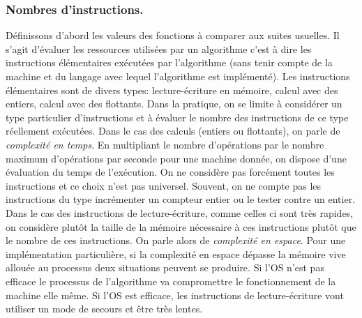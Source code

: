 \subsubsection{Nombres d'instructions.}
Définissons d'abord les valeurs des fonctions à comparer aux suites usuelles.\newline
Il s'agit d'évaluer les ressources utilisées par un algorithme c'est à dire les instructions élémentaires exécutées par l'algorithme (sans tenir compte de la machine et du langage avec lequel l'algorithme est implémenté).\newline
Les instructions élémentaires sont de divers types: lecture-écriture en mémoire, calcul avec des entiers, calcul avec des flottants.
Dans la pratique, on se limite à considérer un type particulier d'instructions et à évaluer le nombre des instructions de ce type réellement exécutées.\newline
Dans le cas des calculs (entiers ou flottants), on parle de \emph{complexité en temps}. En multipliant le nombre d'opérations par le nombre maximum d'opérations par seconde pour une machine donnée, on dispose d'une évaluation du temps de l'exécution. On ne considère pas forcément toutes les instructions et ce choix n'est pas universel. Souvent, on ne compte pas les instructions du type incrémenter un compteur entier ou le tester contre un entier.\newline
Dans le cas des instructions de lecture-écriture, comme celles ci sont très rapides, on considère plutôt la taille de la mémoire nécessaire à ces instructions plutôt que le nombre de ces instructions. On parle alors de \emph{complexité en espace}. Pour une implémentation particulière, si la complexité en espace dépasse la mémoire vive allouée au processus deux situations peuvent se produire. Si l'OS n'est pas efficace le processus de l'algorithme va compromettre le fonctionnement de la machine elle même. Si l'OS est efficace, les instructions de lecture-écriture vont utiliser un mode de secours et être très lentes.

